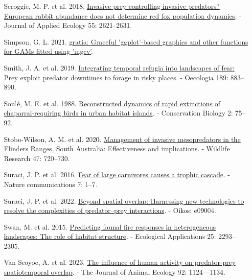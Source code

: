 \documentclass[preprint, 3p, authoryear]{elsarticle} %
\newlength{\cslhangindent}
\newlength{\cslentryspacingunit} %
\newenvironment{CSLReferences}[2] %
 {%
  \setlength{\parindent}{0pt}
  \ifodd #1
  \let\oldpar\par
  \def\par{\hangindent=\cslhangindent\oldpar}
  \fi
  \setlength{\parskip}{#2\cslentryspacingunit}
 }%
 {}
\begin{document}
\begin{CSLReferences}{1}{0}
\leavevmode{}%
Scroggie, M. P. et al. 2018. \href{https://doi.org/10.1111/1365-2664.13253}{Invasive prey controlling invasive predators? European rabbit abundance does not determine red fox population dynamics}. - Journal of Applied Ecology 55: 2621--2631.

\leavevmode{}%
Simpson, G. L. 2021. \href{https://gavinsimpson.github.io/gratia/}{{g}ratia: Graceful 'ggplot'-based graphics and other functions for GAMs fitted using 'mgcv'}.

\leavevmode{}%
Smith, J. A. et al. 2019. \href{https://doi.org/10.1007/s00442-019-04381-5}{Integrating temporal refugia into landscapes of fear: Prey exploit predator downtimes to forage in risky places}. - Oecologia 189: 883--890.

\leavevmode{}%
Soulé, M. E. et al. 1988. \href{https://doi.org/10.1111/j.1523-1739.1988.tb00337.x}{Reconstructed dynamics of rapid extinctions of chaparral-requiring birds in urban habitat islands}. - Conservation Biology 2: 75--92.

\leavevmode{}%
Stobo-Wilson, A. M. et al. 2020. \href{https://doi.org/10.1071/WR19237}{Management of invasive mesopredators in the {Flinders Ranges, South {A}ustralia}: Effectiveness and implications}. - Wildlife Research 47: 720--730.

\leavevmode{}%
Suraci, J. P. et al. 2016. \href{https://doi.org/10.1038/ncomms10698}{Fear of large carnivores causes a trophic cascade}. - Nature communications 7: 1--7.

\leavevmode{}%
Suraci, J. P. et al. 2022. \href{https://doi.org/10.1111/oik.09004}{Beyond spatial overlap: Harnessing new technologies to resolve the complexities of predator--prey interactions}. - Oikos: e09004.

\leavevmode{}%
Swan, M. et al. 2015. \href{https://doi.org/10.1890/14-1533.1}{Predicting faunal fire responses in heterogeneous landscapes: The role of habitat structure}. - Ecological Applications 25: 2293--2305.

\leavevmode{}%
Van Scoyoc, A. et al. 2023. \href{https://doi.org/10.1111/1365-2656.13892}{The influence of human activity on predator-prey spatiotemporal overlap}. - The Journal of Animal Ecology 92: 1124---1134.


\end{CSLReferences}
\end{document}
